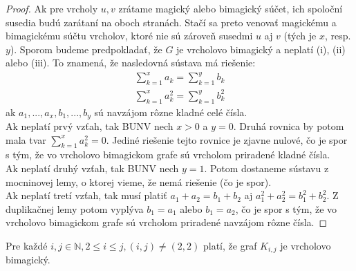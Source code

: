 \begin{proof} Ak pre vrcholy $u,v$ zrátame magický alebo bimagický súčet, ich spoloční susedia budú zarátaní na oboch stranách. Stačí sa preto venovať magickému a bimagickému súčtu vrcholov, ktoré nie sú zároveň susedmi $u$ aj $v$ (tých je $x$, resp. $y$). Sporom budeme predpokladať, že $G$ je vrcholovo bimagický a neplatí (i), (ii) alebo (iii). To znamená, že nasledovná sústava má riešenie:
\begin{gather}
\sum_{k=1}^{x} a_k = \sum_{k=1}^{y} b_k \\
\sum_{k=1}^{x} a^2_k = \sum_{k=1}^{y} b^2_k
\end{gather}
ak $a_1, ... , a_x, b_1, ... , b_y$ sú navzájom rôzne kladné celé čísla. \\

Ak neplatí prvý vzťah, tak BUNV nech $x > 0$ a $y = 0$. Druhá rovnica by potom mala tvar $\sum_{k=1}^{x} a^2_k = 0$. Jediné riešenie tejto rovnice je zjavne nulové, čo je spor s tým, že vo vrcholovo bimagickom grafe sú vrcholom priradené kladné čísla.  \\

Ak neplatí druhý vzťah, tak BUNV nech $y = 1$. Potom dostaneme sústavu z mocninovej lemy, o ktorej vieme, že nemá riešenie (čo je spor). \\

Ak neplatí tretí vzťah, tak musí platiť $a_1 + a_2 = b_1 + b_2$ aj $a^2_1 + a^2_2 = b^2_1 + b^2_2$. Z duplikačnej lemy potom vyplýva $b_1 = a_1$ alebo $b_1 = a_2$,  čo je spor s tým, že vo vrcholovo bimagickom grafe sú vrcholom priradené navzájom rôzne čísla.
\end{proof}

\begin{subtheorem}
\label{vbgkij}
Pre každé  $i,j \in \mathbb{N}, 2 \leq i \leq j, (i, j) \neq (2, 2)$ platí, že graf $K_{i,j}$ je vrcholovo bimagický.
\end{subtheorem}

